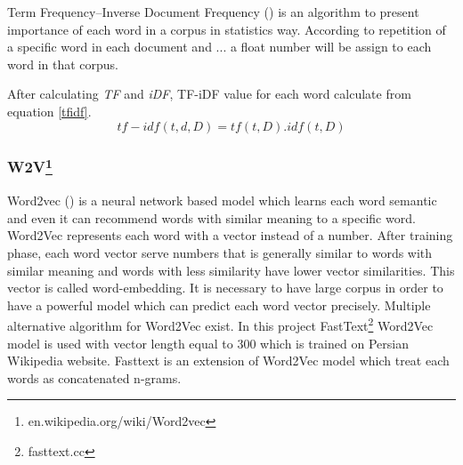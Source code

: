 Term Frequency–Inverse Document Frequency (\cite{tfidf}) is an algorithm to present importance of each word in a corpus in statistics way. According to repetition of a specific word in each document and ... a float number will be assign to each word in that corpus.  

\noindent
After calculating \textit{TF} and \textit{iDF}, TF-iDF value for each word calculate from equation \ref{tfidf}.
\begin{equation}
	\label{tfidf}
	tf-idf\left(t,d,D\right) =  tf \left( t,D\right) . idf \left( t,D\right)
\end{equation}


\subsubsection{W2V\protect\footnote{en.wikipedia.org/wiki/Word2vec}}
Word2vec (\cite{word2vec}) is a neural network based model which learns each word semantic and even it can recommend words with similar meaning to a specific word. Word2Vec represents each word with a vector instead of a number. After training phase, each word vector serve numbers that is generally similar to words with similar meaning and words with less similarity have lower vector similarities. This vector is called word-embedding. It is necessary to have large corpus in order to have a powerful model which can predict each word vector precisely. Multiple alternative algorithm for Word2Vec exist. In this project FastText\footnote{fasttext.cc} Word2Vec model is used with vector length equal to 300 which is trained on Persian Wikipedia website. Fasttext is an extension of Word2Vec model which treat each words as concatenated n-grams.  


